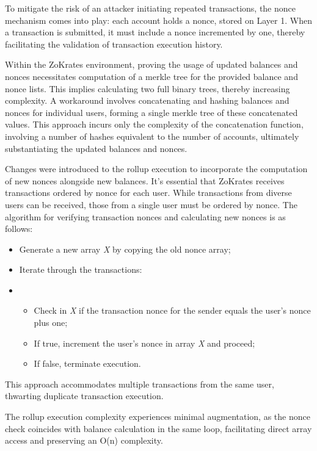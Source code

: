 To mitigate the risk of an attacker initiating repeated transactions, the nonce mechanism comes into play: each account holds a nonce, stored on Layer 1. When a transaction is submitted, it must include a nonce incremented by one, thereby facilitating the validation of transaction execution history.

Within the ZoKrates environment, proving the usage of updated balances and nonces necessitates computation of a merkle tree for the provided balance and nonce lists. This implies calculating two full binary trees, thereby increasing complexity. A workaround involves concatenating and hashing balances and nonces for individual users, forming a single merkle tree of these concatenated values. This approach incurs only the complexity of the concatenation function, involving a number of hashes equivalent to the number of accounts, ultimately substantiating the updated balances and nonces.

Changes were introduced to the rollup execution to incorporate the computation of new nonces alongside new balances. It's essential that ZoKrates receives transactions ordered by nonce for each user. While transactions from diverse users can be received, those from a single user must be ordered by nonce. The algorithm for verifying transaction nonces and calculating new nonces is as follows:
\begin{itemize}
	\item Generate a new array \textit{X} by copying the old nonce array;
	\item Iterate through the transactions:
	\item \begin{itemize}
		\item Check in \textit{X} if the transaction nonce for the sender equals the user's nonce plus one;
		\item If true, increment the user's nonce in array \textit{X} and proceed;
		\item If false, terminate execution.
    \end{itemize}
\end{itemize}

This approach accommodates multiple transactions from the same user, thwarting duplicate transaction execution.

The rollup execution complexity experiences minimal augmentation, as the nonce check coincides with balance calculation in the same loop, facilitating direct array access and preserving an O(n) complexity.

